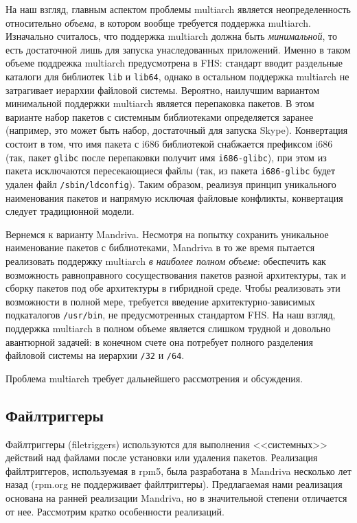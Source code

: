 \documentclass[russian,a4paper,12pt,titlepage]{article}
\begin{document}
На наш взгляд, главным аспектом проблемы multiarch является неопределенность относительно \emph{объема}, в котором
вообще требуется поддержка multiarch.  Изначально считалось, что поддержка multiarch должна быть \emph{минимальной}, то есть
достаточной лишь для запуска унаследованных приложений.  Именно в таком объеме поддрежка multiarch предусмотрена в FHS:
стандарт вводит раздельные каталоги для библиотек \verb|lib| и \verb|lib64|, однако в остальном поддержка multiarch не затрагивает
иерархии файловой системы.  Вероятно, наилучшим вариантом минимальной поддержки multiarch является перепаковка пакетов.
В этом варианте набор пакетов с системным библиотеками определяется заранее (например, это может быть набор, достаточный
для запуска Skype).  Конвертация состоит в том, что имя пакета с i686 библиотекой снабжается префиксом i686 (так, пакет
\verb|glibc| после перепаковки получит имя \verb|i686-glibc|), при этом из пакета исключаются пересекающиеся файлы (так,
из пакета \verb|i686-glibc| будет удален файл \verb|/sbin/ldconfig|).  Таким образом, реализуя принцип уникального
наименования пакетов и напрямую исключая файловые конфликты, конвертация следует традиционной модели.

Вернемся к варианту Mandriva.  Несмотря на попытку сохранить уникальное наименование пакетов с библиотеками, Mandriva
в то же время пытается реализовать поддержку multiarch \emph{в наиболее полном объеме}: обеспечить как возможность
равноправного сосуществования пакетов разной архитектуры, так и сборку пакетов под обе архитектуры в гибридной среде.
Чтобы реализовать эти возможности в полной мере, требуется введение архитектурно-зависимых подкаталогов \verb|/usr/bin|,
не предусмотренных стандартом FHS.  На наш взгляд, поддержка multiarch в полном объеме является слишком трудной и довольно
авантюрной задачей: в конечном счете она потребует полного разделения файловой системы на иерархии \verb|/32| и \verb|/64|.

Проблема multiarch требует дальнейшего рассмотрения и обсуждения.

\subsection{Файлтриггеры}
\label{filetriggers}
Файлтриггеры (filetriggers) используются для выполнения <<системных>> действий над файлами после установки или удаления пакетов.
Реализация файлтриггеров, используемая в rpm5, была разработана в Mandriva несколько лет назад (rpm.org не поддерживает файлтриггеры).
Предлагаемая нами реализация основана на ранней реализации Mandriva, но в значительной степени отличается от нее.
Рассмотрим кратко особенности реализаций.
\end{document}
